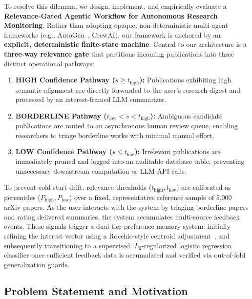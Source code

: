 To resolve this dilemma, we design, implement, and empirically evaluate a \textbf{Relevance-Gated Agentic Workflow for Autonomous Research Monitoring}. Rather than adopting opaque, non-deterministic multi-agent frameworks (e.g., AutoGen~\cite{wu2023autogen}, CrewAI), our framework is anchored by an \textbf{explicit, deterministic finite-state machine}. Central to our architecture is a \textbf{three-way relevance gate} that partitions incoming publications into three distinct operational pathways:
\begin{enumerate}
    \item \textbf{HIGH Confidence Pathway ($s \ge t_{\text{high}}$):} Publications exhibiting high semantic alignment are directly forwarded to the user's research digest and processed by an interest-framed LLM summarizer.
    \item \textbf{BORDERLINE Pathway ($t_{\text{low}} < s < t_{\text{high}}$):} Ambiguous candidate publications are routed to an asynchronous human review queue, enabling researchers to triage borderline works with minimal manual effort.
    \item \textbf{LOW Confidence Pathway ($s \le t_{\text{low}}$):} Irrelevant publications are immediately pruned and logged into an auditable database table, preventing unnecessary downstream computation or LLM API calls.
\end{enumerate}

To prevent cold-start drift, relevance thresholds ($t_{\text{high}}, t_{\text{low}}$) are calibrated as percentiles ($P_{\text{high}}, P_{\text{low}}$) over a fixed, representative reference sample of 5,000 arXiv papers. As the user interacts with the system by triaging borderline papers and rating delivered summaries, the system accumulates multi-source feedback events. These signals trigger a dual-tier preference memory system: initially refining the interest vector using a Rocchio-style centroid adjustment~\cite{rocchio1971relevance}, and subsequently transitioning to a supervised, $L_2$-regularized logistic regression classifier once sufficient feedback data is accumulated and verified via out-of-fold generalization guards.

\subsection{Problem Statement and Motivation}
\label{sec:problem_statement}

